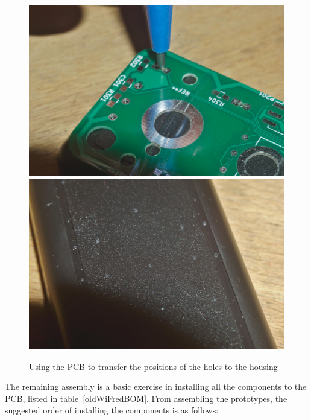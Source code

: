 \documentclass[11pt,a4paper]{scrartcl}
\begin{document}
\begin{figure}[tbh]
  \centering
  \includegraphics[width=0.49 \textwidth]{images/_DSC8652}
  \includegraphics[width=0.49 \textwidth]{images/_DSC8653}
  \caption{Using the PCB to transfer the positions of the holes to the housing}
  \label{oldTransferHoles}
\end{figure}

The remaining assembly is a basic exercise in installing all the components to the PCB, listed in table~\ref{oldWiFredBOM}. From assembling the prototypes, the suggested order of installing the components is as follows:
\end{document}
